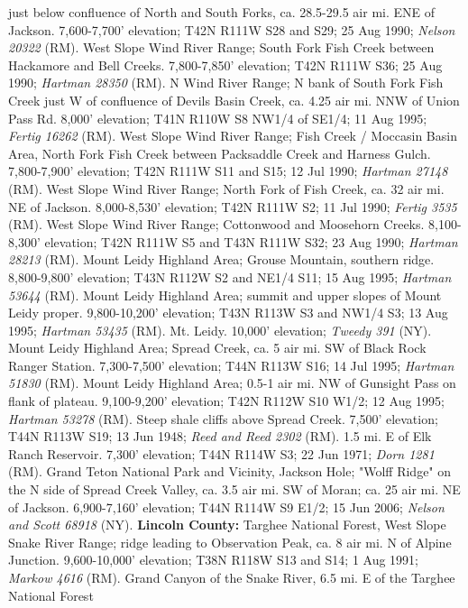 just below confluence of North and South Forks, ca. 28.5-29.5 air mi. ENE of
Jackson. 7,600-7,700' elevation; T42N R111W S28 and S29; 25 Aug 1990;
\textit{Nelson 20322} (RM).
West Slope Wind River Range; South Fork Fish Creek between Hackamore and Bell
Creeks. 7,800-7,850' elevation; T42N R111W S36; 25 Aug 1990;
\textit{Hartman 28350} (RM).
N Wind River Range; N bank of South Fork Fish Creek just W of confluence of
Devils Basin Creek, ca. 4.25 air mi. NNW of Union Pass Rd. 8,000' elevation;
T41N R110W S8 NW1/4 of SE1/4; 11 Aug 1995; \textit{Fertig 16262} (RM).
West Slope Wind River Range; Fish Creek / Moccasin Basin Area, North Fork Fish
Creek between Packsaddle Creek and Harness Gulch. 7,800-7,900' elevation;
T42N R111W S11 and S15; 12 Jul 1990; \textit{Hartman 27148} (RM).
West Slope Wind River Range; North Fork of Fish Creek, ca. 32 air mi. NE of
Jackson. 8,000-8,530' elevation; T42N R111W S2; 11 Jul 1990;
\textit{Fertig 3535} (RM).
West Slope Wind River Range; Cottonwood and Moosehorn Creeks.
8,100-8,300' elevation; T42N R111W S5 and T43N R111W S32; 23 Aug 1990;
\textit{Hartman 28213} (RM).
Mount Leidy Highland Area; Grouse Mountain, southern ridge.
8,800-9,800' elevation; T43N R112W S2 and NE1/4 S11; 15 Aug 1995;
\textit{Hartman 53644} (RM).
Mount Leidy Highland Area; summit and upper slopes of Mount Leidy proper.
9,800-10,200' elevation; T43N R113W S3 and NW1/4 S3; 13 Aug 1995;
\textit{Hartman 53435} (RM).
Mt. Leidy. 10,000' elevation; \textit{Tweedy 391} (NY).
Mount Leidy Highland Area; Spread Creek, ca. 5 air mi. SW of Black Rock Ranger
Station. 7,300-7,500' elevation; T44N R113W S16; 14 Jul 1995;
\textit{Hartman 51830} (RM).
Mount Leidy Highland Area; 0.5-1 air mi. NW of Gunsight Pass on flank of
plateau. 9,100-9,200' elevation; T42N R112W S10 W1/2; 12 Aug 1995;
\textit{Hartman 53278} (RM).
Steep shale cliffs above Spread Creek. 7,500' elevation; T44N R113W S19;
13 Jun 1948; \textit{Reed and Reed 2302} (RM).
1.5 mi. E of Elk Ranch Reservoir. 7,300' elevation; T44N R114W S3; 22 Jun 1971;
\textit{Dorn 1281} (RM).
Grand Teton National Park and Vicinity, Jackson Hole; "Wolff Ridge" on the N
side of Spread Creek Valley, ca. 3.5 air mi. SW of Moran; ca. 25 air mi.
NE of Jackson. 6,900-7,160' elevation; T44N R114W S9 E1/2; 15 Jun 2006;
\textit{Nelson and Scott 68918} (NY).
  \textbf{Lincoln County:}
Targhee National Forest, West Slope Snake River Range; ridge leading to
Observation Peak, ca. 8 air mi. N of Alpine Junction. 9,600-10,000' elevation;
T38N R118W S13 and S14; 1 Aug 1991; \textit{Markow 4616} (RM).
Grand Canyon of the Snake River, 6.5 mi. E of the Targhee National Forest
